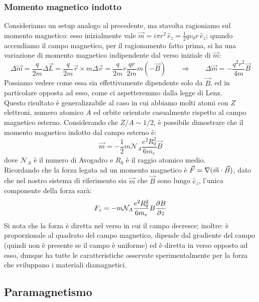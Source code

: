 \documentclass[]{article}
\begin{document}
\subsubsection{Momento magnetico indotto}

Consideriamo un setup analogo al precedente, ma stavolta ragioniamo sul momento magnetico: esso inizialmente vale $ \vec{m} = i \pi r^2 \,\hat{e}_z = \frac{1}{2}qv_0r\,\hat{e}_z $; quando accendiamo il campo magnetico, per il ragionamento fatto prima, si ha una variazione di momento magnetico indipendente dal verso iniziale di $ \vec{m} $:
\begin{equation}
	\Delta\vec{m} = \frac{q}{2m} \Delta\vec{L} = \frac{q}{2m} \vec{r}\times m\Delta\vec{v} = \frac{q}{2m} r\frac{qr}{2m}m(-\vec{B}) \qquad\Longrightarrow\qquad \Delta\vec{m} = - \frac{q^2 r^2}{4m} \vec{B}
	\label{eq:6}
\end{equation}
Possiamo vedere come essa sia effettivamente dipendente solo da $ \vec{B} $, ed in particolare opposta ad esso, come ci aspetteremmo dalla legge di Lenz. \\ 
%
Questo risultato è generalizzabile al caso in cui abbiamo molti atomi con $ Z $ elettroni, numero atomico $ A $ ed orbite orientate casualmente rispetto al campo magnetico esterno. Considerando che $ Z / A \sim 1 / 2 $, è possibile dimostrare che il momento magnetico indotto dal campo esterno è:
\begin{equation}
	\vec{m} = -\frac{1}{2} m \mathcal{N}_A \frac{e^2 R_0^2}{6 m_e} \vec{B}
	\label{eq:7}
\end{equation}
dove $ \mathcal{N}_A $ è il numero di Avogadro e $ R_0 $ è il raggio atomico medio. \\ 
%
Ricordando che la forza legata ad un momento magnetico è $ \vec{F} = \nabla(\vec{m}\cdot\vec{B}) $, dato che nel nostro sistema di riferimento sia $ \vec{m} $ che $ \vec{B} $ sono lungo $ \hat{e}_z $, l'unica componente della forza sarà:
\begin{equation}
	F_z = - m \mathcal{N}_A \frac{e^2 R_0^2}{6 m_e} B \frac{\partial B}{\partial z}
	\label{eq:8}
\end{equation}
Si nota che la forza è diretta nel verso in cui il campo decresce; inoltre: è proporzionale al quadrato del campo magnetico, dipende dal gradiente del campo (quindi non è presente se il campo è uniforme) ed è diretta in verso opposto ad esso, dunque ha tutte le caratteristiche osservate sperimentalmente per la forza che sviluppano i materiali diamagnetici.

\subsection{Paramagnetismo}
\end{document}
